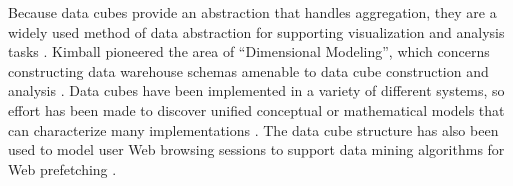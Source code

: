 Because data cubes provide an abstraction that handles aggregation, they are a widely used method of data abstraction for supporting visualization and analysis tasks \cite{stolte2003multiscale}. Kimball pioneered the area of ``Dimensional Modeling'', which concerns constructing data warehouse schemas amenable to data cube construction and analysis \cite{kimball1998data}. Data cubes have been implemented in a variety of different systems, so effort has been made to discover unified conceptual or mathematical models that can characterize many implementations \cite{datta1999cube, vassiliadis1999survey, vassiliadis1998modeling, li1996data, agrawal1997modeling, gyssens1997foundation, blaschka1998finding}. The data cube structure has also been used to model user Web browsing sessions to support data mining algorithms for Web prefetching \cite{yang2003data}.
%
%
